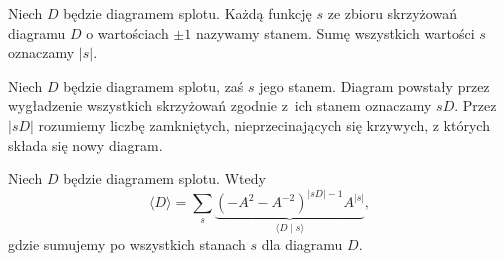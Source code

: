 \begin{definition}[stan]
    Niech $D$ będzie diagramem splotu.
    Każdą funkcję $s$ ze zbioru skrzyżowań diagramu $D$ o wartościach $\pm 1$ nazywamy stanem.
    Sumę wszystkich wartości $s$ oznaczamy $|s|$.
\end{definition}

\begin{definition}
    Niech $D$ będzie diagramem splotu, zaś $s$ jego stanem.
    Diagram powstały przez wygładzenie wszystkich skrzyżowań zgodnie z~ich stanem oznaczamy $sD$.
    Przez $|sD|$ rozumiemy liczbę zamkniętych, nieprzecinających się krzywych, z których składa się nowy diagram.
\end{definition}

\begin{proposition}
    Niech $D$ będzie diagramem splotu.
    Wtedy
    \begin{equation}
        \langle D\rangle = \sum_s \underbrace{(-A^2-A^{-2})^{|sD|-1} A^{|s|}}_{\langle D \mid s \rangle},
    \end{equation}
    gdzie sumujemy po wszystkich stanach $s$ dla diagramu $D$.
\end{proposition}

